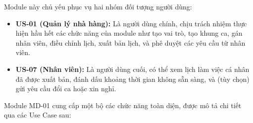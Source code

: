 \label{sssec:md01_primary_users}
Module này chủ yếu phục vụ hai nhóm đối tượng người dùng:
\begin{itemize}
    \item \textbf{US-01 (Quản lý nhà hàng):} Là người dùng chính, chịu trách nhiệm thực hiện hầu hết các chức năng của module như tạo vai trò, tạo khung ca, gán nhân viên, điều chỉnh lịch, xuất bản lịch, và phê duyệt các yêu cầu từ nhân viên.
    \item \textbf{US-07 (Nhân viên):} Là người dùng cuối, có thể xem lịch làm việc cá nhân đã được xuất bản, đánh dấu khoảng thời gian không sẵn sàng, và (tùy chọn) gửi yêu cầu đổi ca hoặc xin nghỉ.
\end{itemize}

\label{sssec:md01_key_functionalities}
Module MD-01 cung cấp một bộ các chức năng toàn diện, được mô tả chi tiết qua các Use Case sau:

